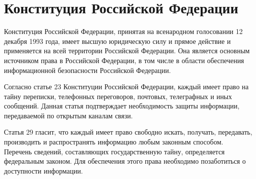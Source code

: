 \section{Конституция Российской Федерации} \label{rights_constitution}

Конституция Российской Федерации, принятая на всенародном голосовании 12 декабря 1993 года, имеет высшую юридическую силу и прямое действие и применяется на всей территории Российской Федерации. Она является основным источником права в Российской Федерации, в том числе в области обеспечения информационной безопасности Российской Федерации.

\vspace{\baselineskip}
Согласно статье 23 Конституции Российской Федерации, каждый имеет право на тайну переписки, телефонных переговоров, почтовых, телеграфных и иных сообщений. Данная статья подтверждает необходимость защиты информации, передаваемой по открытым каналам связи.

\vspace{\baselineskip}
Статья 29 гласит, что каждый имеет право свободно искать, получать, передавать, производить и распространять информацию любым законным способом. Перечень сведений, составляющих государственную тайну, определяется федеральным законом. Для обеспечения этого права необходимо позаботиться о доступности информации.
